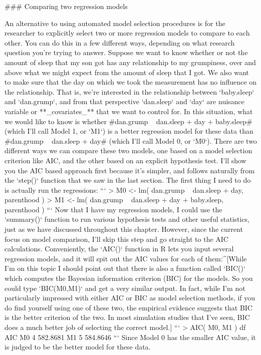 ### Comparing two regression models

An alternative to using automated model selection procedures is for the researcher to explicitly select two or more regression models to compare to each other. You can do this in a few different ways, depending on what research question you're trying to answer. Suppose we want to know whether or not the amount of sleep that my son got has any relationship to my grumpiness, over and above what we might expect from the amount of sleep that I got. We also want to make sure that the day on which we took the measurement has no influence on the relationship. That is, we're interested in the relationship between `baby.sleep` and `dan.grump`, and from that perspective `dan.sleep` and `day` are nuisance variable or **_covariates_** that we want to control for. In this situation, what we would like to know is whether \rtextverb#dan.grump ~ dan.sleep + day + baby.sleep# (which I'll call Model 1, or `M1`) is a better regression model for these data than \rtextverb#dan.grump ~ dan.sleep + day# (which I'll call Model 0, or `M0`). There are two different ways we can compare these two models, one based on a model selection criterion like AIC, and the other based on an explicit hypothesis test. I'll show you the AIC based approach first because it's simpler, and follows naturally from the `step()` function that we saw in the last section. The first thing I need to do is actually run the regressions:
```
> M0 <- lm( dan.grump ~ dan.sleep + day, parenthood )
> M1 <- lm( dan.grump ~ dan.sleep + day + baby.sleep, parenthood )
```
Now that I have my regression models, I could use the `summary()` function to run various hypothesis tests and other useful statistics, just as we have discussed throughout this chapter. However, since the current focus on model comparison, I'll skip this step and go straight to the AIC calculations. Conveniently, the `AIC()` function in R lets you input several regression models, and it will spit out the AIC values for each of them:^[While I'm on this topic I should point out that there is also a function called `BIC()` which computes the Bayesian information criterion (BIC) for the models. So you could type `BIC(M0,M1)` and get a very similar output. In fact, while I'm not particularly impressed with either AIC or BIC as model selection methods, if you do find yourself using one of these two, the empirical evidence suggests that BIC is the better criterion of the two. In most simulation studies that I've seen, BIC does a much better job of selecting the correct model.]
```
> AIC( M0, M1 )
   df      AIC
M0  4 582.8681
M1  5 584.8646
```
Since Model 0 has the smaller AIC value, it is judged to be the better model for these data. 

